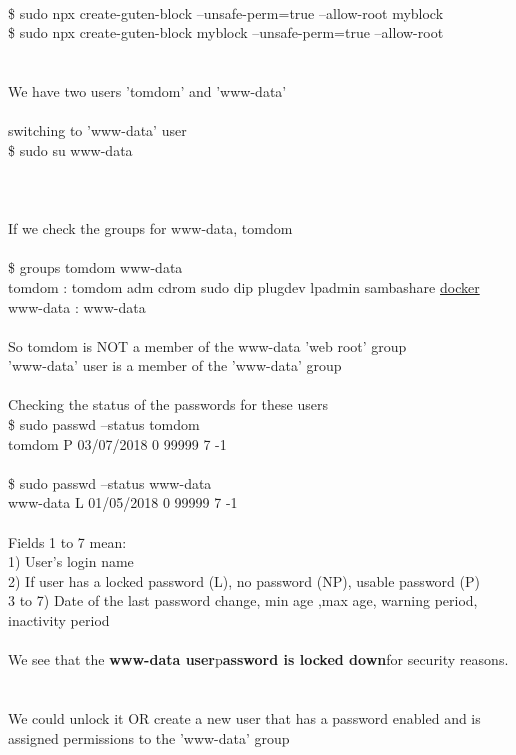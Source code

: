 \documentclass[10pt,a4paper]{article}
\begin{document}
{{{{{{{{{{{{{{{{{{{{\\
\$ sudo npx create-guten-block --unsafe-perm=true --allow-root myblock\\
\$ sudo npx create-guten-block myblock --unsafe-perm=true --allow-root\\
\\
\\
We have two users 'tomdom' and 'www-data'\\
\\
switching to 'www-data' user\\
\$ sudo su www-data\\
\\
\\
\\
If we check the groups for www-data, tomdom\\
\\
\$ groups tomdom www-data\\
tomdom : tomdom adm cdrom sudo dip plugdev lpadmin sambashare \hyperlink{docker}{docker}}{\large \\
www-data : www-data\\
\\
So tomdom is NOT a member of the www-data 'web root' group\\
'www-data' user is a member of the 'www-data' group\\
\\
Checking the status of the passwords for these users\\
\$ sudo passwd --status tomdom\\
tomdom P 03/07/2018 0 99999 7 -1\\
\\
\$ sudo passwd --status www-data\\
www-data L 01/05/2018 0 99999 7 -1\\
\\
Fields 1 to 7 mean:\\
1) User's login name\\
2) If user has a locked password (L), no password (NP), usable password (P)\\
3 to 7) Date of the last password change, min age ,max age, warning period, inactivity period\\
\\
We see that the \textbf{www-data user}}{\large  p\textbf{assword is locked down}}{\large  for security reasons.\\
\\
\\
We could unlock it OR create a new user that has a password enabled and is assigned permissions to the 'www-data' group\\
}}}}}}}}}}}}}}}}}}}}
\end{document}
